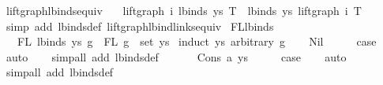\begin{isabellebody}
\endisatagproof
{\isafoldproof}%
%
\isadelimproof
\isanewline
%
\endisadelimproof
\isanewline
\isanewline
{}\isamarkupfalse%
\ lift{\isacharunderscore}{\kern0pt}graph{\isacharunderscore}{\kern0pt}lbinds{\isacharunderscore}{\kern0pt}equiv{\isacharcolon}{\kern0pt}\isanewline
\ \ \ {\isachardoublequoteopen}lift{\isacharunderscore}{\kern0pt}graph\ i\ {\isacharparenleft}{\kern0pt}lbinds\ ys\ T{\isacharparenright}{\kern0pt}\ {\isacharequal}{\kern0pt}\ lbinds\ ys\ {\isacharparenleft}{\kern0pt}lift{\isacharunderscore}{\kern0pt}graph\ i\ T{\isacharparenright}{\kern0pt}{\isachardoublequoteclose}\isanewline
%
\isadelimproof
%
\endisadelimproof
%
\isatagproof
{}\isamarkupfalse%
\ {\isacharparenleft}{\kern0pt}simp\ add{\isacharcolon}{\kern0pt}\ lbinds{\isacharunderscore}{\kern0pt}def\ lift{\isacharunderscore}{\kern0pt}graph{\isacharunderscore}{\kern0pt}lbind{\isacharunderscore}{\kern0pt}links{\isacharunderscore}{\kern0pt}equiv{\isacharparenright}{\kern0pt}%
\endisatagproof
{\isafoldproof}%
%
\isadelimproof
\isanewline
%
\endisadelimproof
\isanewline
\isanewline
{}\isamarkupfalse%
\ FL{\isacharunderscore}{\kern0pt}lbinds{\isacharcolon}{\kern0pt}\isanewline
\ \ \ {\isachardoublequoteopen}FL\ {\isacharparenleft}{\kern0pt}lbinds\ ys\ g{\isacharparenright}{\kern0pt}\ {\isacharequal}{\kern0pt}\ FL\ g\ {\isacharminus}{\kern0pt}\ set\ ys{\isachardoublequoteclose}\isanewline
%
\isadelimproof
%
\endisadelimproof
%
\isatagproof
{}\isamarkupfalse%
\ {\isacharparenleft}{\kern0pt}induct\ ys\ arbitrary{\isacharcolon}{\kern0pt}\ g{\isacharparenright}{\kern0pt}\isanewline
\ \ \isamarkupfalse%
\ Nil\isanewline
\ \ \isamarkupfalse%
\ \isamarkupfalse%
\ {\isacharquery}{\kern0pt}case\isanewline
\ \ \isamarkupfalse%
\ auto\isanewline
\ \ \isamarkupfalse%
\ {\isacharparenleft}{\kern0pt}simp{\isacharunderscore}{\kern0pt}all\ add{\isacharcolon}{\kern0pt}\ lbinds{\isacharunderscore}{\kern0pt}def{\isacharparenright}{\kern0pt}\isanewline
\ \ \isamarkupfalse%
\isanewline
{}\isamarkupfalse%
\isanewline
\ \ \isamarkupfalse%
\ {\isacharparenleft}{\kern0pt}Cons\ a\ ys{\isacharparenright}{\kern0pt}\isanewline
\ \ \isamarkupfalse%
\ \isamarkupfalse%
\ {\isacharquery}{\kern0pt}case\isanewline
\ \ \isamarkupfalse%
\ auto\isanewline
\ \ \isamarkupfalse%
\ {\isacharparenleft}{\kern0pt}simp{\isacharunderscore}{\kern0pt}all\ add{\isacharcolon}{\kern0pt}\ lbinds{\isacharunderscore}{\kern0pt}def{\isacharparenright}{\kern0pt}\isanewline

\end{isabellebody}
